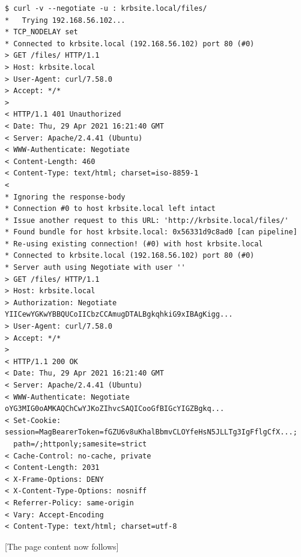 \documentclass{report}
\begin{document}
\begin{verbatim}
$ curl -v --negotiate -u : krbsite.local/files/
*   Trying 192.168.56.102...
* TCP_NODELAY set
* Connected to krbsite.local (192.168.56.102) port 80 (#0)
> GET /files/ HTTP/1.1
> Host: krbsite.local
> User-Agent: curl/7.58.0
> Accept: */*
>
< HTTP/1.1 401 Unauthorized
< Date: Thu, 29 Apr 2021 16:21:40 GMT
< Server: Apache/2.4.41 (Ubuntu)
< WWW-Authenticate: Negotiate
< Content-Length: 460
< Content-Type: text/html; charset=iso-8859-1
<
* Ignoring the response-body
* Connection #0 to host krbsite.local left intact
* Issue another request to this URL: 'http://krbsite.local/files/'
* Found bundle for host krbsite.local: 0x56331d9c8ad0 [can pipeline]
* Re-using existing connection! (#0) with host krbsite.local
* Connected to krbsite.local (192.168.56.102) port 80 (#0)
* Server auth using Negotiate with user ''
> GET /files/ HTTP/1.1
> Host: krbsite.local
> Authorization: Negotiate YIICewYGKwYBBQUCoIICbzCCAmugDTALBgkqhkiG9xIBAgKigg...
> User-Agent: curl/7.58.0
> Accept: */*
>
< HTTP/1.1 200 OK
< Date: Thu, 29 Apr 2021 16:21:40 GMT
< Server: Apache/2.4.41 (Ubuntu)
< WWW-Authenticate: Negotiate oYG3MIG0oAMKAQChCwYJKoZIhvcSAQICooGfBIGcYIGZBgkq...
< Set-Cookie: session=MagBearerToken=fGZU6v8uKhalBbmvCLOYfeHsN5JLLTg3IgFflgCfX...;
  path=/;httponly;samesite=strict
< Cache-Control: no-cache, private
< Content-Length: 2031
< X-Frame-Options: DENY
< X-Content-Type-Options: nosniff
< Referrer-Policy: same-origin
< Vary: Accept-Encoding
< Content-Type: text/html; charset=utf-8
\end{verbatim}
[The page content now follows]
\end{document}
